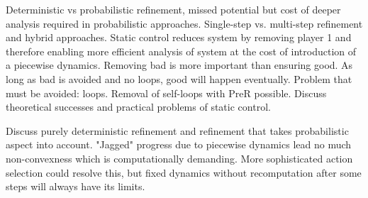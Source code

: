 Deterministic vs probabilistic refinement, missed potential but cost of deeper analysis required in probabilistic approaches.
Single-step vs. multi-step refinement and hybrid approaches.
Static control reduces system by removing player 1 and therefore enabling more efficient analysis of system at the cost of introduction of a piecewise dynamics.
Removing bad is more important than ensuring good.
As long as bad is avoided and no loops, good will happen eventually.
Problem that must be avoided: loops.
Removal of self-loops with PreR possible.
Discuss theoretical successes and practical problems of static control.

Discuss purely deterministic refinement and refinement that takes probabilistic aspect into account.
"Jagged" progress due to piecewise dynamics lead no much non-convexness which is computationally demanding.
More sophisticated action selection could resolve this, but fixed dynamics without recomputation after some steps will always have its limits.

